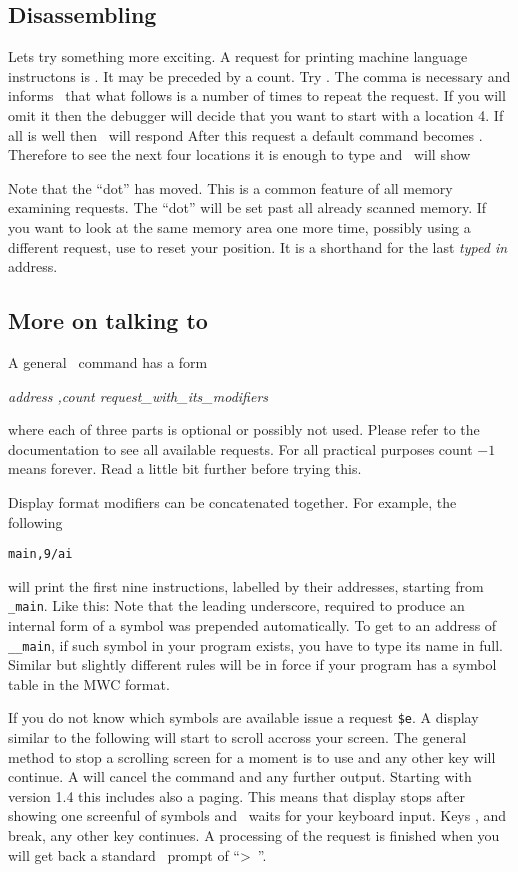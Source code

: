 \subsection{Disassembling}
Lets try something more exciting.  A request for printing machine
language instructons is .  It may be preceded by a count.
Try .  The comma is necessary and informs \szadb\
that what follows is a number of times to repeat the request.
If you will omit it then the debugger will decide that 
you want to start with a location 4.
If all is well then \szadb\ will respond
After this request a default command becomes .  Therefore to see
the next four locations it is enough to type \name{,4} and \szadb\
will show
\readexample{reptdis.exm}
\par
Note that the ``dot'' has moved.  This is a common feature of all memory 
examining requests. The  ``dot'' will be set past all already scanned
memory.  If you want to look at the same memory area one more time,
possibly using a different request,
use \name{\&} to reset your position.
It is a shorthand for the last {\em typed in\/} address.

\subsection{More on talking to \szadb}
A general \szadb\ command has a form
\begin{exmpl}
	{\it address ,count request\_with\_its\_modifiers}
\end{exmpl}
where each of three parts is optional or possibly not used.
Please refer to the documentation to see all available requests.
For all practical purposes count $-1$ means forever.
Read a little bit further before trying this.

Display format modifiers can be concatenated together. For example,
the following
\begin{exmpl}
	{\tt main,9/ai}
\end{exmpl}
will print the first nine instructions,
labelled by their addresses, starting from \verb|_main|. Like this:
\readexample{maindis.exm}
Note that the leading underscore, required to produce an internal form of
a symbol \name{main} was prepended automatically.  To get to an
address of \verb|__main|, if such symbol in your program exists,
you have to type its name in full.  Similar but slightly different
rules will be in force if your program has a symbol table
in the MWC format.

If you do not know which symbols are available issue a request \verb|$e|.
A display similar to the following will start to scroll accross your screen.
\readexample{symbols.exm}
The general method to stop a scrolling screen
for a moment is to use  and any other key will
continue.  A \key{\carret C} will cancel the command and any further
output. Starting with version 1.4 this includes also a paging.  This
means that display stops after showing one screenful of symbols and
\szadb\ waits for your keyboard input.  Keys \key{q}, \key{Q} and
\key{\carret C} break, any other key continues.  A processing of 
the request is finished when you will get back
a standard \szadb\ prompt of ``>~''.

